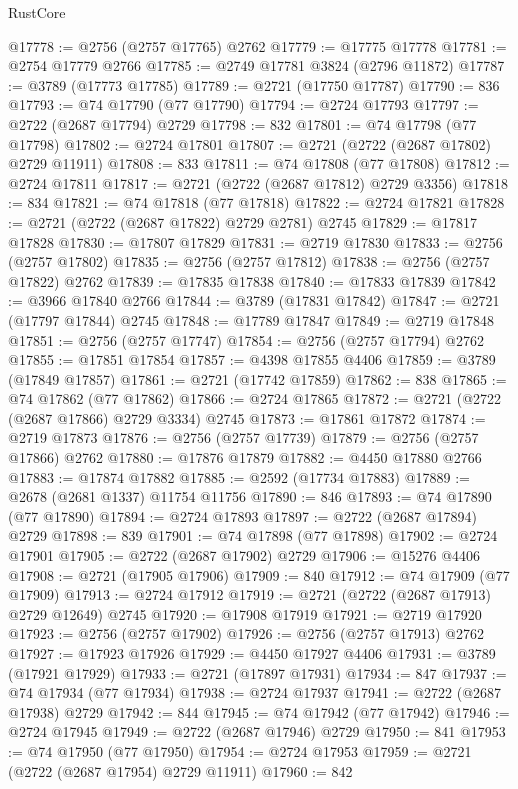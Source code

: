 \begin{lexlean}{RustCore}
\begin{coremodule}
@17778 := @2756 (@2757 @17765) @2762
@17779 := @17775 @17778
@17781 := @2754 @17779 @2766
@17785 := @2749 @17781 @3824 (@2796 @11872)
@17787 := @3789 (@17773 @17785)
@17789 := @2721 (@17750 @17787)
@17790 := 836
@17793 := @74 @17790 (@77 @17790)
@17794 := @2724 @17793
@17797 := @2722 (@2687 @17794) @2729
@17798 := 832
@17801 := @74 @17798 (@77 @17798)
@17802 := @2724 @17801
@17807 := @2721 (@2722 (@2687 @17802) @2729 @11911)
@17808 := 833
@17811 := @74 @17808 (@77 @17808)
@17812 := @2724 @17811
@17817 := @2721 (@2722 (@2687 @17812) @2729 @3356)
@17818 := 834
@17821 := @74 @17818 (@77 @17818)
@17822 := @2724 @17821
@17828 := @2721 (@2722 (@2687 @17822) @2729 @2781) @2745
@17829 := @17817 @17828
@17830 := @17807 @17829
@17831 := @2719 @17830
@17833 := @2756 (@2757 @17802)
@17835 := @2756 (@2757 @17812)
@17838 := @2756 (@2757 @17822) @2762
@17839 := @17835 @17838
@17840 := @17833 @17839
@17842 := @3966 @17840 @2766
@17844 := @3789 (@17831 @17842)
@17847 := @2721 (@17797 @17844) @2745
@17848 := @17789 @17847
@17849 := @2719 @17848
@17851 := @2756 (@2757 @17747)
@17854 := @2756 (@2757 @17794) @2762
@17855 := @17851 @17854
@17857 := @4398 @17855 @4406
@17859 := @3789 (@17849 @17857)
@17861 := @2721 (@17742 @17859)
@17862 := 838
@17865 := @74 @17862 (@77 @17862)
@17866 := @2724 @17865
@17872 := @2721 (@2722 (@2687 @17866) @2729 @3334) @2745
@17873 := @17861 @17872
@17874 := @2719 @17873
@17876 := @2756 (@2757 @17739)
@17879 := @2756 (@2757 @17866) @2762
@17880 := @17876 @17879
@17882 := @4450 @17880 @2766
@17883 := @17874 @17882
@17885 := @2592 (@17734 @17883)
@17889 := @2678 (@2681 @1337) @11754 @11756
@17890 := 846
@17893 := @74 @17890 (@77 @17890)
@17894 := @2724 @17893
@17897 := @2722 (@2687 @17894) @2729
@17898 := 839
@17901 := @74 @17898 (@77 @17898)
@17902 := @2724 @17901
@17905 := @2722 (@2687 @17902) @2729
@17906 := @15276 @4406
@17908 := @2721 (@17905 @17906)
@17909 := 840
@17912 := @74 @17909 (@77 @17909)
@17913 := @2724 @17912
@17919 := @2721 (@2722 (@2687 @17913) @2729 @12649) @2745
@17920 := @17908 @17919
@17921 := @2719 @17920
@17923 := @2756 (@2757 @17902)
@17926 := @2756 (@2757 @17913) @2762
@17927 := @17923 @17926
@17929 := @4450 @17927 @4406
@17931 := @3789 (@17921 @17929)
@17933 := @2721 (@17897 @17931)
@17934 := 847
@17937 := @74 @17934 (@77 @17934)
@17938 := @2724 @17937
@17941 := @2722 (@2687 @17938) @2729
@17942 := 844
@17945 := @74 @17942 (@77 @17942)
@17946 := @2724 @17945
@17949 := @2722 (@2687 @17946) @2729
@17950 := 841
@17953 := @74 @17950 (@77 @17950)
@17954 := @2724 @17953
@17959 := @2721 (@2722 (@2687 @17954) @2729 @11911)
@17960 := 842

\end{coremodule}
\end{lexlean}
